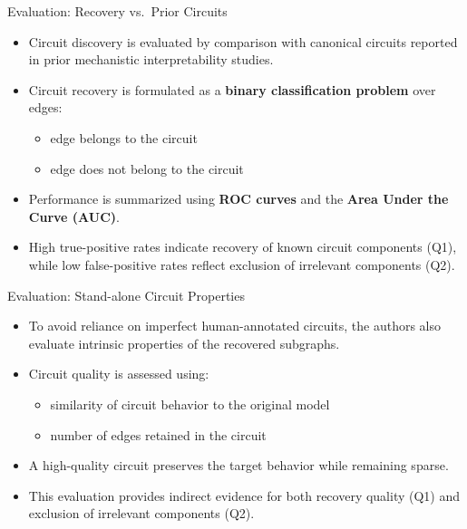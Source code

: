 \documentclass{beamer}
\begin{document}
	\begin{frame}{Evaluation: Recovery vs.\ Prior Circuits}
		\begin{itemize}
			\item Circuit discovery is evaluated by comparison with
			canonical circuits reported in prior mechanistic
			interpretability studies.
			
			\item Circuit recovery is formulated as a
			\textbf{binary classification problem} over edges:
			\begin{itemize}
				\item edge belongs to the circuit
				\item edge does not belong to the circuit
			\end{itemize}
			
			\item Performance is summarized using
			\textbf{ROC curves} and the
			\textbf{Area Under the Curve (AUC)}.
			
			\item High true-positive rates indicate recovery of known
			circuit components (Q1), while low false-positive rates
			reflect exclusion of irrelevant components (Q2).
		\end{itemize}
	\end{frame}
	
	\begin{frame}{Evaluation: Stand-alone Circuit Properties}
		\begin{itemize}
			\item To avoid reliance on imperfect human-annotated circuits,
			the authors also evaluate intrinsic properties of the
			recovered subgraphs.
			
			\item Circuit quality is assessed using:
			\begin{itemize}
				\item similarity of circuit behavior to the original model
				\item number of edges retained in the circuit
			\end{itemize}
			
			\item A high-quality circuit preserves the target behavior
			while remaining sparse.
			
			\item This evaluation provides indirect evidence for both
			recovery quality (Q1) and exclusion of irrelevant components
			(Q2).
		\end{itemize}
	\end{frame}
	
\end{document}
